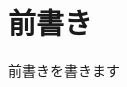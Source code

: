 \documentclass[../../main]{subfiles}
\begin{document}
    \chapter{前書き}\label{ch:preface}

    前書きを書きます

    \clearpage
\end{document}
